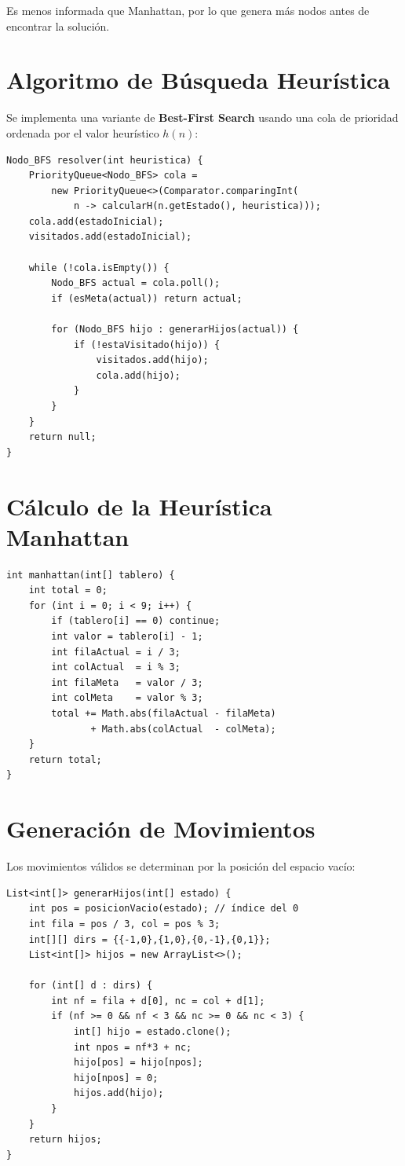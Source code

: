 \documentclass[12pt,a4paper]{article}
\begin{document}
Es menos informada que Manhattan, por lo que genera más nodos antes de encontrar la solución.

\section{Algoritmo de Búsqueda Heurística}

Se implementa una variante de \textbf{Best-First Search} usando una cola de prioridad ordenada por el valor heurístico $h(n)$:

\begin{lstlisting}
Nodo_BFS resolver(int heuristica) {
    PriorityQueue<Nodo_BFS> cola =
        new PriorityQueue<>(Comparator.comparingInt(
            n -> calcularH(n.getEstado(), heuristica)));
    cola.add(estadoInicial);
    visitados.add(estadoInicial);

    while (!cola.isEmpty()) {
        Nodo_BFS actual = cola.poll();
        if (esMeta(actual)) return actual;

        for (Nodo_BFS hijo : generarHijos(actual)) {
            if (!estaVisitado(hijo)) {
                visitados.add(hijo);
                cola.add(hijo);
            }
        }
    }
    return null;
}
\end{lstlisting}

\section{Cálculo de la Heurística Manhattan}

\begin{lstlisting}
int manhattan(int[] tablero) {
    int total = 0;
    for (int i = 0; i < 9; i++) {
        if (tablero[i] == 0) continue;
        int valor = tablero[i] - 1;
        int filaActual = i / 3;
        int colActual  = i % 3;
        int filaMeta   = valor / 3;
        int colMeta    = valor % 3;
        total += Math.abs(filaActual - filaMeta)
               + Math.abs(colActual  - colMeta);
    }
    return total;
}
\end{lstlisting}

\section{Generación de Movimientos}

Los movimientos válidos se determinan por la posición del espacio vacío:

\begin{lstlisting}
List<int[]> generarHijos(int[] estado) {
    int pos = posicionVacio(estado); // índice del 0
    int fila = pos / 3, col = pos % 3;
    int[][] dirs = {{-1,0},{1,0},{0,-1},{0,1}};
    List<int[]> hijos = new ArrayList<>();

    for (int[] d : dirs) {
        int nf = fila + d[0], nc = col + d[1];
        if (nf >= 0 && nf < 3 && nc >= 0 && nc < 3) {
            int[] hijo = estado.clone();
            int npos = nf*3 + nc;
            hijo[pos] = hijo[npos];
            hijo[npos] = 0;
            hijos.add(hijo);
        }
    }
    return hijos;
}
\end{lstlisting}
\end{document}
